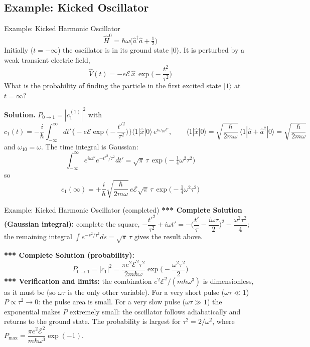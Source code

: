 \documentclass[11pt,a4paper]{article}
\begin{document}
\subsection{Example: Kicked Oscillator}
\begin{prob}{Example: Kicked Harmonic Oscillator}
\[
\hat H^0=\hbar\omega\Big(\hat a^\dagger\hat a+\tfrac12\Big)
\]
Initially ($t=-\infty$) the oscillator is in its ground state $|0\rangle$. It is perturbed by a weak transient electric field,
\[
\hat V(t) = -e\mathcal E\,\hat x\,\exp\Big(-\frac{t^2}{\tau^2}\Big)
\]
What is the probability of finding the particle in the first excited state $|1\rangle$ at $t=\infty$?

\medskip
\textbf{Solution.} $P_{0\to1}=|c_1^{(1)}|^2$ with
\[
c_1(t) = -\frac i\hbar\int_{-\infty}^{\infty}dt'\Big\{-e\mathcal E\exp\Big(-\frac{t'^2}{\tau^2}\Big)\Big\}\langle1|\hat x|0\rangle\,e^{i\omega_{10}t'},
\qquad
\langle1|\hat x|0\rangle=\sqrt{\frac\hbar{2m\omega}}\,\langle1|\hat a+\hat a^\dagger|0\rangle=\sqrt{\frac\hbar{2m\omega}}
\]
and $\omega_{10}=\omega$. The time integral is Gaussian:
\[
\int_{-\infty}^{\infty}e^{i\omega t'}e^{-t'^2/\tau^2}dt' = \sqrt\pi\,\tau\,\exp\Big(-\tfrac14\omega^2\tau^2\Big)
\]
so
\[
c_1(\infty) = +\frac i\hbar\sqrt{\frac\hbar{2m\omega}}\,e\mathcal E\sqrt\pi\,\tau\,\exp\Big(-\tfrac14\omega^2\tau^2\Big)
\]
\end{prob}
\begin{prob}{Example: Kicked Harmonic Oscillator (completed)}
\textbf{*** Complete Solution (Gaussian integral):} complete the square, $-\dfrac{t'^2}{\tau^2}+i\omega t'=-\Big(\dfrac{t'}\tau-\dfrac{i\omega\tau}2\Big)^2-\dfrac{\omega^2\tau^2}4$; the remaining integral $\int e^{-s^2/\tau^2}ds=\sqrt\pi\,\tau$ gives the result above.

\textbf{*** Complete Solution (probability):}
\[
\boxed{P_{0\to1}=|c_1|^2=\frac{\pi e^2\mathcal E^2\tau^2}{2m\hbar\omega}\exp\Big(-\frac{\omega^2\tau^2}2\Big)}
\]
\textbf{*** Verification and limits:} the combination $e^2\mathcal E^2/(m\hbar\omega^3)$ is dimensionless, as it must be (so $\omega\tau$ is the only other variable). For a very short pulse ($\omega\tau\ll1$) $P\propto\tau^2\to0$: the pulse area is small. For a very slow pulse ($\omega\tau\gg1$) the exponential makes $P$ extremely small: the oscillator follows adiabatically and returns to the ground state. The probability is largest for $\tau^2=2/\omega^2$, where $P_{\max}=\dfrac{\pi e^2\mathcal E^2}{m\hbar\omega^3}\exp(-1)$.
\end{prob}
\end{document}
